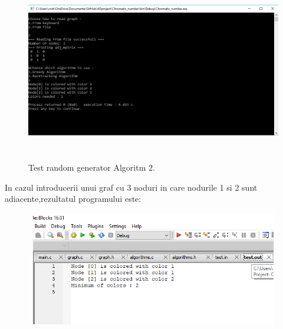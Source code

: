 \documentclass[12pt]{article}
\begin{document}
\begin{figure}[ht!]
\centering
\includegraphics[width=150mm,height=80mm]{testAlgoritm2.png}
\caption{Test random generator Algoritm 2. \label{overflow}}
\end{figure}
\pagebreak
In cazul introducerii unui graf cu 3 noduri in care nodurile 1 si 2 sunt adiacente,rezultatul programului este:
\begin{figure}[ht!]
\centering
\includegraphics[width=120mm,height=50mm]{test1.png}
\end{figure}
\end{document}
